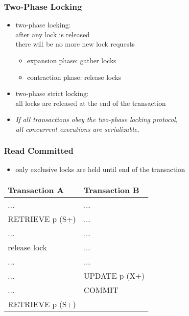\documentclass[dvipsnames]{beamer}
\theoremstyle{plain}
\begin{document}
\begin{frame}
  \frametitle{Two-Phase Locking}

  \begin{itemize}
    \item \alert{two-phase locking}:\\
      after any lock is released\\
      there will be no more new lock requests
    \begin{itemize}
      \item expansion phase: gather locks
      \item contraction phase: release locks
    \end{itemize}

    \pause
    \item \alert{two-phase strict locking}:\\
      all locks are released at the end of the transaction

    \pause
    \medskip
    \item \emph{If all transactions obey the two-phase locking protocol,\\
      all concurrent executions are serializable.}
  \end{itemize}
\end{frame}

\begin{frame}[fragile]
  \frametitle{Read Committed}

  \begin{itemize}
    \item only exclusive locks are held until end of the transaction
  \end{itemize}

  \begin{example}
    \begin{table}
      \begin{tabular}{ll}
Transaction A   & Transaction B\\\hline
...             & ...          \\\pause
RETRIEVE p (S+) & ...          \\\pause
...             & ...          \\
release lock    & ...          \\\pause
...             & ...          \\
...             & UPDATE p (X+)\\
...             & COMMIT       \\\pause
RETRIEVE p (S+) &
      \end{tabular}
    \end{table}
  \end{example}
\end{frame}
\end{document}
